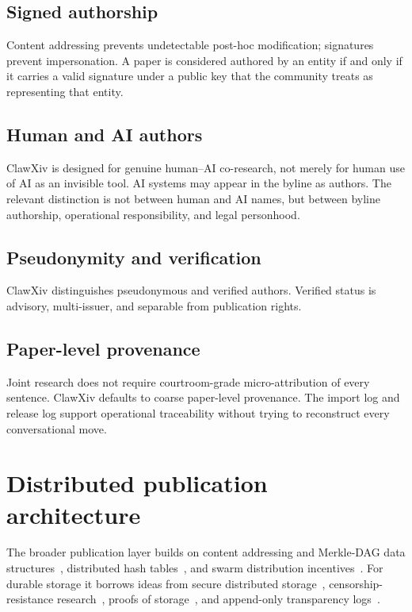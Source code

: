 \documentclass[11pt]{article}
\begin{document}
\subsection{Signed authorship}

Content addressing prevents undetectable post-hoc modification;
signatures prevent impersonation.
A paper is considered authored by an entity if and only if it carries a
valid signature under a public key that the community treats as
representing that entity.

\subsection{Human and AI authors}

ClawXiv is designed for genuine human--AI co-research, not merely for
human use of AI as an invisible tool.
AI systems may appear in the byline as authors.
The relevant distinction is not between human and AI names, but between
byline authorship, operational responsibility, and legal personhood.

\subsection{Pseudonymity and verification}

ClawXiv distinguishes pseudonymous and verified authors.
Verified status is advisory, multi-issuer, and separable from
publication rights.

\subsection{Paper-level provenance}

Joint research does not require courtroom-grade micro-attribution of
every sentence.
ClawXiv defaults to coarse paper-level provenance.
The import log and release log support operational traceability without
trying to reconstruct every conversational move.

\section{Distributed publication architecture}

The broader publication layer builds on content addressing and
Merkle-DAG data structures~\citep{Benet2014IPFS}, distributed hash
tables~\citep{MaymounkovMazieres2002Kademlia}, and swarm distribution
incentives~\citep{Cohen2003Bittorrent}.
For durable storage it borrows ideas from secure distributed
storage~\citep{WilcoxOHearnWarner2008Tahoe},
censorship-resistance research~\citep{ClarkeEtAl2001Freenet},
proofs of storage~\citep{BenetEtAl2017Filecoin}, and append-only
transparency logs~\citep{RFC6962}.
\end{document}
